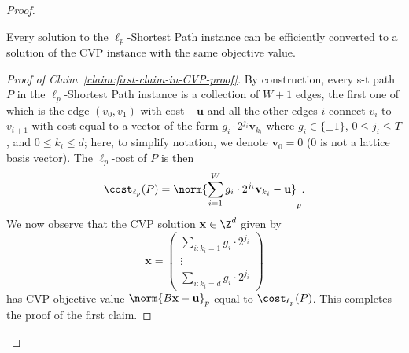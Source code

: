 \documentclass[11pt,a4paper]{article}
\begin{document}
\begin{proof}
    \begin{claim}\label{claim:first-claim-in-CVP-proof}
        Every solution to the $\ell_p$-Shortest Path instance can be efficiently converted to a solution of the CVP instance with the same objective value.
    \end{claim}
    \begin{proof}[Proof of Claim~\ref{claim:first-claim-in-CVP-proof}]
        By construction, every s-t path \(P\) in the $\ell_p$-Shortest Path instance is a collection of $W+1$ edges, the first one of which is the edge $(v_0,v_1)$ with cost $-\mathbf{u}$ and all the other edges $i$ connect $v_i$ to $v_{i+1}$ with cost equal to a vector of the form $g_i \cdot 2^{j_i} \mathbf{v}_{k_i}$ where $g_i\in\{\pm 1\}$, $0 \le j_i \le T$, and $0\leq k_i\leq d$; here, to simplify notation, we denote $\mathbf{v}_0 = 0$ ($0$ is not a lattice basis vector). The $\ell_p$-cost of \(P\) is then
        \begin{equation}
           \cost_{\ell_p}(P) = \norm{\sum_{i=1}^W g_i \cdot 2^{j_i }\mathbf{v}_{k_i}- \mathbf{u}}_p.
        \end{equation}
        We now observe that the CVP solution $\mathbf{x}\in \Z^d$ given by
        \begin{equation}\label{eq:x-in-terms-of-path}
            \mathbf{x} = \begin{pmatrix}
                \sum_{i:k_i=1} g_i \cdot 2^{j_i}\\
                \vdots\\
                \sum_{i:k_i=d} g_i \cdot 2^{j_i}
            \end{pmatrix}
        \end{equation}
        \noindent
        has CVP objective value $\norm{B\mathbf{x} - \mathbf{u}}_p$ equal to $\cost_{\ell_p}(P)$. This completes the proof of the first claim.
        \end{proof}
        

\end{proof}
\end{document}
